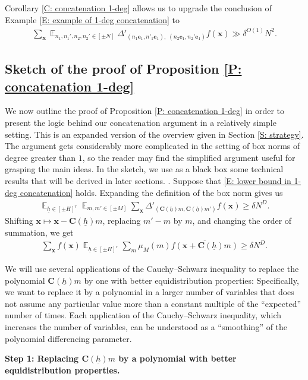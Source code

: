 \documentclass[11pt]{amsart}
\theoremstyle{definition}
\DeclareMathOperator*{\E}{\mathbb{E}}
\newcommand{\bc}{{\textbf{C}}}
\newcommand{\be}{{\mathbf{e}}}
\newcommand{\bx}{{\textbf{x}}}
\newcommand{\uh}{{\underline{h}}}
\begin{document}
Corollary \ref{C: concatenation 1-deg} allows us to upgrade the conclusion of Example \ref{E: example of 1-deg concatenation} to 
\begin{align*}
    \sum_{\bx}\E_{n_1, n_1', n_2, n_2'\in[\pm N]} \Delta'_{(n_1\be_1,n'_1\be_1),\; (n_2\be_1, n_2'\be_1)} f(\bx)\gg \delta^{O(1)}N^{2}.
\end{align*}

\subsection{Sketch of the proof of Proposition \ref{P: concatenation 1-deg}}
We now outline the proof of Proposition \ref{P: concatenation 1-deg} in order to present the logic behind our concatenation argument in a relatively simple setting.  This is an expanded version of the overview given in Section \ref{S: strategy}. The argument gets considerably more complicated in the setting of box norms of degree greater than $1$, so the reader may find the simplified argument useful for grasping the main ideas. In the sketch, we use as a black box some technical results that will be derived in later sections.
. 
Suppose that \eqref{E: lower bound in 1-deg concatenation} holds. Expanding the definition of the box norm gives us
\begin{align*}
    \E_{\uh\in[\pm H]^r}\E_{m, m'\in[\pm M]}\sum_{\bx} \Delta'_{(\bc(\uh) m, \bc(\uh) m')}f(\bx)\geq \delta N^D.
\end{align*}
Shifting $\bx \mapsto \bx-\bc(\uh)m$, replacing $m'-m$ by $m$, and changing the order of summation, we get
\begin{align*}
    \sum_\bx f(\bx) \E_{\uh\in[\pm H]^r}\sum_{m}\mu_M(m) \overline{f(\bx + \bc(\uh) m)}\geq \delta N^D.
\end{align*}

We will use several applications of the Cauchy--Schwarz inequality to replace the polynomial $\bc(\uh)m$ by one with better equidistribution properties: Specifically, we want to replace it by a polynomial in a larger number of variables that does not assume any particular value more than a constant multiple of the ``expected'' number of times. Each application of the Cauchy--Schwarz inequality, which increases the number of variables, can be understood as a ``smoothing'' of the polynomial differencing parameter.

\smallskip
\textbf{Step 1: Replacing $\bc(\uh)m$ by a polynomial with better equidistribution properties.}
\smallskip
\end{document}
